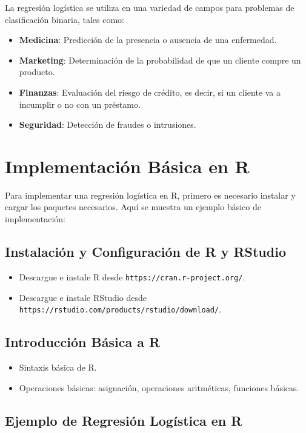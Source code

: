 \documentclass{article}
\begin{document}
La regresión logística se utiliza en una variedad de campos para problemas de clasificación binaria, tales como:
\begin{itemize}
    \item \textbf{Medicina}: Predicción de la presencia o ausencia de una enfermedad.
    \item \textbf{Marketing}: Determinación de la probabilidad de que un cliente compre un producto.
    \item \textbf{Finanzas}: Evaluación del riesgo de crédito, es decir, si un cliente va a incumplir o no con un préstamo.
    \item \textbf{Seguridad}: Detección de fraudes o intrusiones.
\end{itemize}

\section{Implementación Básica en R}

Para implementar una regresión logística en R, primero es necesario instalar y cargar los paquetes necesarios. Aquí se muestra un ejemplo básico de implementación:

\subsection{Instalación y Configuración de R y RStudio}
\begin{itemize}
    \item Descargue e instale R desde \texttt{https://cran.r-project.org/}.
    \item Descargue e instale RStudio desde \texttt{https://rstudio.com/products/rstudio/download/}.
\end{itemize}

\subsection{Introducción Básica a R}
\begin{itemize}
    \item Sintaxis básica de R.
    \item Operaciones básicas: asignación, operaciones aritméticas, funciones básicas.
\end{itemize}

\subsection{Ejemplo de Regresión Logística en R}
\end{document}
